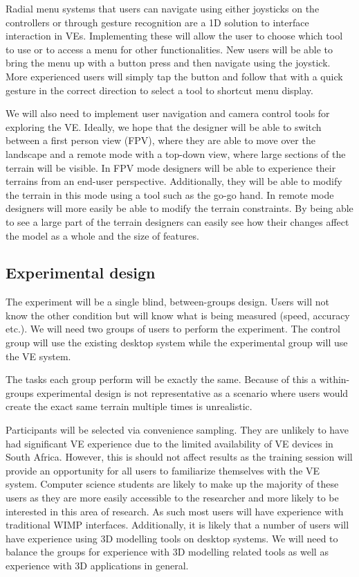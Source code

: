\documentclass{sig-alternate-05-2015}
\begin{document}
Radial menu systems that users can navigate using either joysticks on the controllers or through gesture recognition are a 1D solution to interface interaction in VEs\cite{Hand1997}. Implementing these will allow the user to choose which tool to use or to access a menu for other functionalities. New users will be able to bring the menu up with a button press and then navigate using the joystick. More experienced users will simply tap the button and follow that with a quick gesture in the correct direction to select a tool to shortcut menu display.

We will also need to implement user navigation and camera control tools for exploring the VE. Ideally, we hope that the designer will be able to switch between a first person view (FPV), where they are able to move over the landscape and a remote mode with a top-down view, where large sections of the terrain will be visible. In FPV mode designers will be able to experience their terrains from an end-user perspective. Additionally, they will be able to modify the terrain in this mode using a tool such as the go-go hand\cite{Poupyrev1996}. In remote mode designers will more easily be able to modify the terrain constraints. By being able to see a large part of the terrain designers can easily see how their changes affect the model as a whole and the size of features.


\subsection{Experimental design}
The experiment will be a single blind, between-groups design. Users will not know the other condition but will know what is being measured (speed, accuracy etc.). We will need two groups of users to perform the experiment. The control group will use the existing desktop system while the experimental group will use the VE system.

The tasks each group perform will be exactly the same. Because of this a within-groups experimental design is not representative as a scenario where users would create the exact same terrain multiple times is unrealistic.

Participants will be selected via convenience sampling. They are unlikely to have had significant VE experience due to the limited availability of VE devices in South Africa. However, this is should not affect results as the training session will provide an opportunity for all users to familiarize themselves with the VE system. Computer science students are likely to make up the majority of these users as they are more easily accessible to the researcher and more likely to be interested in this area of research. As such most users will have experience with traditional WIMP interfaces. Additionally, it is likely that a number of users will have experience using 3D modelling tools on desktop systems. We will need to balance the groups for experience with 3D modelling related tools as well as experience with 3D applications in general. 
\end{document}

